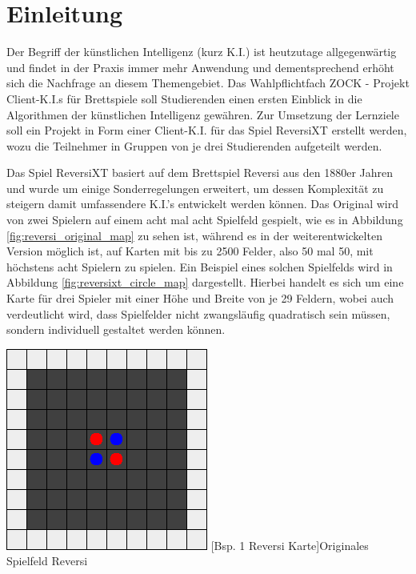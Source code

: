 \documentclass[12pt,a4paper,bibliography=totocnumbered,listof=totocnumbered]{article}
\begin{document}
\section{Einleitung} \label{kap:Einleitung}
Der Begriff der \glqq künstlichen Intelligenz\grqq{} (kurz K.I.) ist heutzutage allgegenwärtig und findet in der Praxis immer mehr Anwendung und dementsprechend erhöht sich die Nachfrage an diesem Themengebiet.
Das Wahlpflichtfach \glqq ZOCK - Projekt Client-K.I.s für Brettspiele\grqq{} soll Studierenden einen ersten Einblick in die Algorithmen der künstlichen Intelligenz gewähren. Zur Umsetzung der Lernziele soll ein Projekt in Form einer Client-K.I. für das Spiel ReversiXT erstellt werden, wozu die Teilnehmer in Gruppen von je drei Studierenden aufgeteilt werden. 

Das Spiel ReversiXT basiert auf dem Brettspiel Reversi aus den 1880er Jahren und wurde um einige Sonderregelungen erweitert, um dessen Komplexität zu steigern damit umfassendere K.I.'s entwickelt werden können. Das Original wird von zwei Spielern auf einem acht mal acht Spielfeld gespielt, wie es in Abbildung \ref{fig:reversi_original_map} zu sehen ist, während es in der weiterentwickelten Version möglich ist, auf Karten mit bis zu 2500 Felder, also 50 mal 50, mit höchstens acht Spielern zu spielen. Ein Beispiel eines solchen Spielfelds wird in Abbildung \ref{fig:reversixt_circle_map} dargestellt. Hierbei handelt es sich um eine Karte für drei Spieler mit einer Höhe und Breite von je 29 Feldern, wobei auch verdeutlicht wird, dass Spielfelder nicht zwangsläufig quadratisch sein müssen, sondern individuell gestaltet werden können.

\vspace{1em}
\begin{minipage}{\linewidth}
	\centering
	\includegraphics[width=0.4\linewidth]{pics/reversi_original_map.png}
	[Bsp. 1 Reversi Karte]{Originales Spielfeld Reversi}
	\label{fig:reversi_original_map}
\end{minipage}
\\
\end{document}
